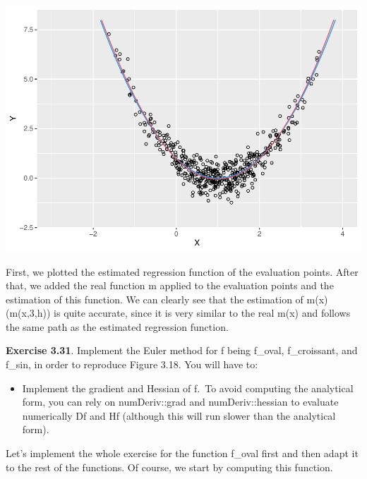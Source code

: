 \documentclass[
]{article}
\providecommand{\tightlist}{%
  \setlength{\itemsep}{0pt}\setlength{\parskip}{0pt}}
\begin{document}
\includegraphics{prueba_files/figure-latex/unnamed-chunk-10-1.pdf}

First, we plotted the estimated regression function of the evaluation
points. After that, we added the real function m applied to the
evaluation points and the estimation of this function. We can clearly
see that the estimation of m(x) (m(x,3,h)) is quite accurate, since it
is very similar to the real m(x) and follows the same path as the
estimated regression function.

\textbf{Exercise 3.31}. Implement the Euler method for f being f\_oval,
f\_croissant, and f\_sin, in order to reproduce Figure 3.18. You will
have to:

\begin{itemize}
\tightlist
\item
  Implement the gradient and Hessian of f.~To avoid computing the
  analytical form, you can rely on numDeriv::grad and numDeriv::hessian
  to evaluate numerically Df and Hf (although this will run slower than
  the analytical form).
\end{itemize}

Let's implement the whole exercise for the function f\_oval first and
then adapt it to the rest of the functions. Of course, we start by
computing this function.
\end{document}
